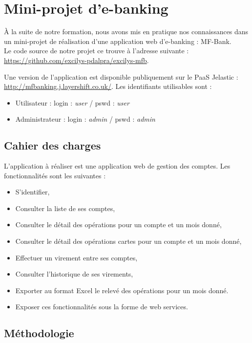 \section{Mini-projet d'e-banking}

À la suite de notre formation, nous avons mis en pratique nos connaissances dans un mini-projet de réalisation d'une application web d'e-banking : MF-Bank.\\

Le code source de notre projet ce trouve à l'adresse suivante : \url{https://github.com/excilys-pdalpra/excilys-mfb}.

Une version de l'application est disponible publiquement sur le PaaS Jelastic\cite{jelastic} : \url{ http://mfbanking.j.layershift.co.uk/}. Les identifiants utilisables sont :

\begin{itemize}
	\item Utilisateur : login : \textit{user} / pswd : \textit{user}
	\item Administrateur : login : \textit{admin} / pswd : \textit{admin}
\end{itemize}

\subsection{Cahier des charges}

L'application à réaliser est une application web de gestion des comptes. Les fonctionnalités sont les suivantes :

\begin{itemize}
	\item S'identifier,
	\item Consulter la liste de ses comptes,
	\item Consulter le détail des opérations pour un compte et un mois donné,
	\item Consulter le détail des opérations cartes pour un compte et un mois donné,
	\item Effectuer un virement entre ses comptes,
	\item Consulter l'historique de ses virements,
	\item Exporter au format Excel le relevé des opérations pour un mois donné.
	\item Exposer ces fonctionnalités sous la forme de web services.
\end{itemize}

\subsection{Méthodologie}


